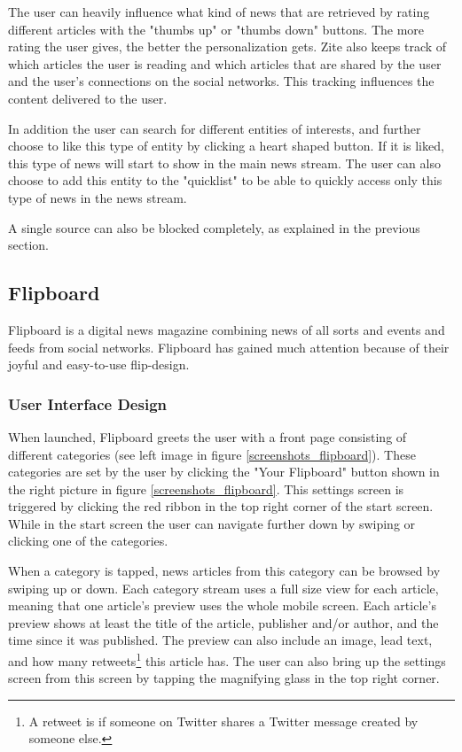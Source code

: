The user can heavily influence what kind of news that are retrieved by rating different articles with the "thumbs up" or "thumbs down" buttons. The more rating the user gives, the better the personalization gets. Zite also keeps track of which articles the user is reading and which articles that are shared by the user and the user's connections on the social networks. This tracking influences the content delivered to the user.

In addition the user can search for different entities of interests, and further choose to like this type of entity by clicking a heart shaped button. If it is liked, this type of news will start to show in the main news stream. The user can also choose to add this entity to the "quicklist" to be able to quickly access only this type of news in the news stream.

A single source can also be blocked completely, as explained in the previous section.



\subsection{Flipboard}
Flipboard is a digital news magazine combining news of all sorts and events and feeds from social networks. Flipboard has gained much attention because of their joyful and easy-to-use flip-design.

\subsubsection{User Interface Design}
When launched, Flipboard greets the user with a front page consisting of different categories (see left image in figure \ref{screenshots_flipboard}). These categories are set by the user by clicking the "Your Flipboard" button shown in the right picture in figure \ref{screenshots_flipboard}. This settings screen is triggered by clicking the red ribbon in the top right corner of the start screen. While in the start screen the user can navigate further down by swiping or clicking one of the categories.

When a category is tapped, news articles from this category can be browsed by swiping up or down. Each category stream uses a full size view for each article, meaning that one article's preview uses the whole mobile screen. Each article's preview shows at least the title of the article, publisher and/or author, and the time since it was published. The preview can also include an image, lead text, and how many retweets\footnote{A retweet is if someone on Twitter shares a Twitter message created by someone else.} this article has. The user can also bring up the settings screen from this screen by tapping the magnifying glass in the top right corner.

